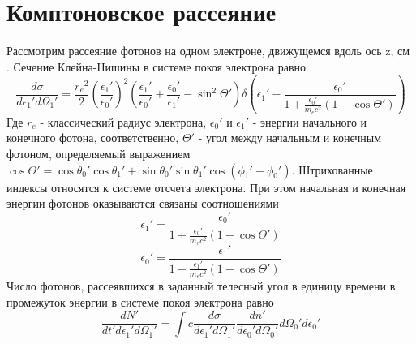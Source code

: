 \section{Комптоновское рассеяние}\label{comptonFormulaSection}
Рассмотрим рассеяние фотонов на одном электроне, движущемся вдоль ось z, см \cite{Dubus}. Сечение Клейна-Нишины в системе покоя электрона равно
\begin{equation}
	\frac{d\sigma}{d\epsilon_1'd\Omega_1'}=\frac{{r_e}^2}{2}\left(\frac{\epsilon_1'}{\epsilon_0'}\right)^2(\frac{\epsilon_1'}{\epsilon_0'}+\frac{\epsilon_0'}{\epsilon_1'}-\sin^2\Theta') \delta(\epsilon_1' - \frac{\epsilon_0'}{1+\frac{\epsilon_0'}{m_e c^2}(1 - \cos \Theta')})
\end{equation}
Где $r_e$ - классический радиус электрона, $\epsilon_0'$ и $\epsilon_1'$ - энергии начального и конечного фотона, соответственно, $\Theta'$ - угол между начальным и конечным фотоном, определяемый выражением $\cos\Theta' =\cos \theta_0' \cos \theta_1' + \sin \theta_0' \sin \theta_1' \cos(\phi_1' - \phi_0')$. Штрихованные индексы относятся к системе отсчета электрона. При этом начальная и конечная энергии фотонов оказываются связаны соотношениями
\begin{equation}
	\epsilon_1'=\frac{\epsilon_0'}{1+\frac{\epsilon_0'}{m_e c^2}(1 - \cos \Theta')}	
\end{equation}
\begin{equation}
	\epsilon_0'=\frac{\epsilon_1'}{1-\frac{\epsilon_1'}{m_e c^2}(1 - \cos \Theta')}
\end{equation}
Число фотонов, рассеявшихся в заданный телесный угол в единицу времени в промежуток энергии в системе покоя электрона равно
\begin{equation}
\frac{dN'}{dt'd\epsilon_1'd\Omega_1'}=\int c \frac{d\sigma}{d\epsilon_1'd\Omega_1'} \frac{dn'}{d\epsilon_0'd\Omega_0'}d\Omega_0'd\epsilon_0'
\end{equation}

